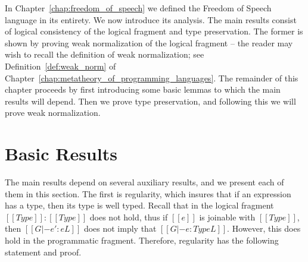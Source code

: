 In Chapter~\ref{chap:freedom_of_speech} we defined the Freedom of
Speech language in its entirety.  We now introduce its analysis.  The
main results consist of logical consistency of the logical fragment
and type preservation.  The former is shown by proving weak
normalization of the logical fragment -- the reader may wish to recall
the definition of weak normalization; see
Definition~\ref{def:weak_norm} of
Chapter~\ref{chap:metatheory_of_programming_languages}.  The remainder
of this chapter proceeds by first introducing some basic lemmas to
which the main results will depend.  Then we prove type preservation,
and following this we will prove weak normalization.

\section{Basic Results}
\label{sec:basic_results}
The main results depend on several auxiliary results, and we present
each of them in this section.  The first is regularity, which
insures that if an expression has a type, then its type is well typed.
Recall that in the logical fragment $[[Type]] : [[Type]]$ does not hold, thus
if $[[e]]$ is joinable with $[[Type]]$, then $[[G |- e' : e L]]$ does
not imply that $[[G |- e : Type L]]$.  However, this does hold in the
programmatic fragment.  Therefore, regularity has the following
statement and proof.

